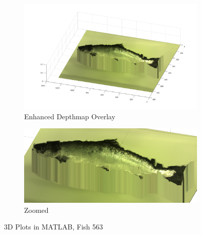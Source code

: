 \begin{figure}[H]
    \medskip
    \begin{subfigure}{0.41\textwidth}
        \includegraphics[width=\linewidth]{images/results/3D_plots/fixed_3D_fish_63}
        \caption{Enhanced Depthmap Overlay}
    \end{subfigure}\hspace*{\fill}
    \begin{subfigure}{0.57\textwidth}
        \includegraphics[width=\linewidth]{images/results/3D_plots/zoomed_fixed_3D_fish_63}
        \caption{Zoomed}
    \end{subfigure}
    
    \caption{3D Plots in MATLAB, Fish 563} 
    \label{fig:3D_plot_63}
\end{figure}


